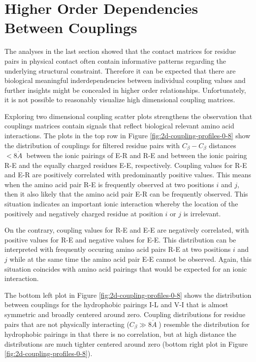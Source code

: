 \documentclass[11pt,a4paper,twoside]{book}
\newcommand{\Cb}{C_\beta}
\newcommand{\angstrom}{\mathring{A} \;}
\theoremstyle{definition}
\theoremstyle{definition}
\theoremstyle{remark}
\begin{document}
\section{Higher Order Dependencies Between
Couplings}\label{higher-order-coupling-profiles}

The analyses in the last section showed that the contact matrices for
residue pairs in physical contact often contain informative patterns
regarding the underlying structural constraint. Therefore it can be
expected that there are biological meaningful inderdependencies between
individual coupling values and further insights might be concealed in
higher order relationships. Unfortunately, it is not possible to
reasonably visualize high dimensional coupling matrices.

Exploring two dimensional coupling scatter plots strengthens the
observation that couplings matrices contain signals that reflect
biological relevant amino acid interactions. The plots in the top row in
Figure \ref{fig:2d-coupling-profiles-0-8} show the distribution of
couplings for filtered residue pairs with \(\Cb-\Cb\) distances
\(< 8\angstrom\) between the ionic pairings of E-R and R-E and between
the ionic pairing R-E and the equally charged residues E-E,
respectively. Coupling values for R-E and E-R are positively correlated
with predominantly positive values. This means when the amino acid pair
R-E is frequently observed at two positions \(i\) and \(j\), then it
also likely that the amino acid pair E-R can be frequently observed.
This situation indicates an important ionic interaction whereby the
location of the positively and negatively charged residue at position
\(i\) or \(j\) is irrelevant.

On the contrary, coupling values for R-E and E-E are negatively
correlated, with positive values for R-E and negative values for E-E.
This distribution can be interpreted with frequently occuring amino acid
pairs R-E at two positions \(i\) and \(j\) while at the same time the
amino acid pair E-E cannot be observed. Again, this situation coincides
with amino acid pairings that would be expected for an ionic
interaction.

The bottom left plot in Figure \ref{fig:2d-coupling-profiles-0-8} shows
the distribution between couplings for the hydrophobic pairings I-L and
V-I that is almost symmetric and broadly centered around zero. Coupling
distributions for residue pairs that are not physically interacting
(\(\Cb \gg 8 \angstrom\)) resemble the distribution for hydrophobic
pairings in that there is no correlation, but at high distance the
distributions are much tighter centered around zero (bottom right plot
in Figure \ref{fig:2d-coupling-profiles-0-8}).
\end{document}

